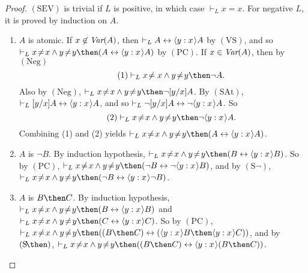 \documentclass[11pt]{woarticle}
\theoremstyle{break}
\theoremstyle{nonumberplain}
\newcommand{\1}{\;\,|\;\,}
\newcommand{\var}{\emph{Var}}
\renewcommand{\t}[1]{\ensuremath{\langle #1  \makebox[.2ex]{}\rangle}}
\newcommand{\T}[1]{\ensuremath{(\mathrm{ #1})}}
\begin{document}
\begin{proof}
  \T{SEV} is trivial if $L$ is positive, in which case $\vdash_L
  x\!=\!x$. For negative $L$, it is proved by induction on $A$.
  \begin{enumerate}
  \item $A$ is atomic.\; If $x \not\in \var(A)$, then $\vdash_L A
    \leftrightarrow \t{y:x} A$ by \T{VS}, and so $\vdash_L x\!\not=\!x
    \land y\!\not=\!y \then (A \leftrightarrow \t{y:x}A)$ by
    \T{PC}. If $x \in \var(A)$, then by \T{Neg}
    \begin{equation}\tag{1}
      \vdash_L x\!\not=x \land y\!\not=\!y \then \neg A.
    \end{equation}
    Also by \T{Neg}, $\vdash_L x\!\not=\!x \land y\!\not=\!y \then
    \neg [y/x]A$. By \T{SAt}, $\vdash_L [y/x]A \leftrightarrow
    \t{y:x}A$, and so $\vdash_L \neg [y/x] A \leftrightarrow \neg
    \t{y:x} A$. So
    \begin{equation}\tag{2}
      \vdash_L x\!\not=\!x \land y\!\not=\!y \then \neg \t{y:x}A.
    \end{equation}
    Combining (1) and (2) yields $\vdash_L x\!\not=\!x \land
    y\!\not=\!y \then (A \leftrightarrow \t{y:x}A)$.

  \item $A$ is $\neg B$.\; By induction hypothesis, $\vdash_L
    x\!\not=\!x \land y\!\not=\!y \then (B \leftrightarrow \t{y:x}B)$.
    So by \T{PC}, $\vdash_L x\!\not=\!x \land y\!\not=\!y \then (\neg
    B \leftrightarrow \neg \t{y:x}B)$, and by \T{S\neg}, $\vdash_L
    x\!\not=\!x \land y\!\not=\!y \then (\neg B \leftrightarrow
    \t{y:x}\neg B)$.

  \item $A$ is $B \then C$.\; By induction hypothesis, $\vdash_L
    x\!\not=\!x \land y\!\not=\!y \then (B \leftrightarrow \t{y:x}B)$
    and $\vdash_L x\!\not=\!x \land y\!\not=\!y \then (C
    \leftrightarrow \t{y:x}C)$. So by \T{PC}, $\vdash_L x\!\not=\!x
    \land y\!\not=\!y \then ((B \then C) \leftrightarrow (\t{y:x}B
    \then \t{y:x}C))$, and by \T{S\!\then}, $\vdash_L x\!\not=\!x
    \land y\!\not=\!y \then ((B \then C) \leftrightarrow \t{y:x}(B
    \then C))$.


\end{enumerate}
\end{proof}
\end{document}
